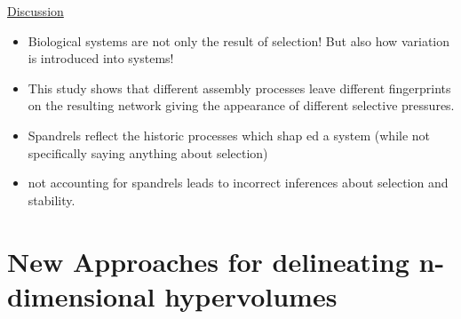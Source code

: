 \documentclass[11pt]{article}
\begin{document}
	\underline{Discussion}
	\begin{itemize}
		\item Biological systems are not only the result of selection! But also how variation is introduced into systems!
		\item This study shows that different assembly processes leave different fingerprints on the resulting network giving the appearance of different selective pressures.
		\item Spandrels reflect the historic processes which shap	ed a system (while not specifically saying anything about selection)
		\item not accounting for spandrels leads to incorrect inferences about selection and stability.
	\end{itemize}

	\section*{New Approaches for delineating n-dimensional hypervolumes \citep{Blonder2018}}
	
	
	
	
\end{document}
